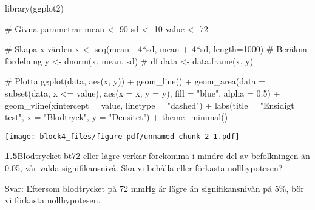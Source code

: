 \documentclass[
  letterpaper,
  DIV=11,
  numbers=noendperiod]{scrartcl}
\newenvironment{Shaded}{\begin{snugshade}}{\end{snugshade}}
\newcommand{\AttributeTok}[1]{\textcolor[rgb]{0.40,0.45,0.13}{#1}}
\newcommand{\CommentTok}[1]{\textcolor[rgb]{0.37,0.37,0.37}{#1}}
\newcommand{\DecValTok}[1]{\textcolor[rgb]{0.68,0.00,0.00}{#1}}
\newcommand{\FloatTok}[1]{\textcolor[rgb]{0.68,0.00,0.00}{#1}}
\newcommand{\FunctionTok}[1]{\textcolor[rgb]{0.28,0.35,0.67}{#1}}
\newcommand{\NormalTok}[1]{\textcolor[rgb]{0.00,0.23,0.31}{#1}}
\newcommand{\OtherTok}[1]{\textcolor[rgb]{0.00,0.23,0.31}{#1}}
\newcommand{\SpecialCharTok}[1]{\textcolor[rgb]{0.37,0.37,0.37}{#1}}
\newcommand{\StringTok}[1]{\textcolor[rgb]{0.13,0.47,0.30}{#1}}
\begin{document}
\begin{Shaded}
\begin{Highlighting}[]
\FunctionTok{library}\NormalTok{(ggplot2)}

\CommentTok{\# Givna parametrar}
\NormalTok{mean }\OtherTok{\textless{}{-}} \DecValTok{90}
\NormalTok{sd }\OtherTok{\textless{}{-}} \DecValTok{10}
\NormalTok{value }\OtherTok{\textless{}{-}} \DecValTok{72}

\CommentTok{\# Skapa x värden}
\NormalTok{x }\OtherTok{\textless{}{-}} \FunctionTok{seq}\NormalTok{(mean }\SpecialCharTok{{-}} \DecValTok{4}\SpecialCharTok{*}\NormalTok{sd, mean }\SpecialCharTok{+} \DecValTok{4}\SpecialCharTok{*}\NormalTok{sd, }\AttributeTok{length=}\DecValTok{1000}\NormalTok{)}
\CommentTok{\# Beräkna fördelning}
\NormalTok{y }\OtherTok{\textless{}{-}} \FunctionTok{dnorm}\NormalTok{(x, mean, sd)}
\CommentTok{\# df}
\NormalTok{data }\OtherTok{\textless{}{-}} \FunctionTok{data.frame}\NormalTok{(x, y)}

\CommentTok{\# Plotta}
\FunctionTok{ggplot}\NormalTok{(data, }\FunctionTok{aes}\NormalTok{(x, y)) }\SpecialCharTok{+}
  \FunctionTok{geom\_line}\NormalTok{() }\SpecialCharTok{+}
  \FunctionTok{geom\_area}\NormalTok{(}\AttributeTok{data =} \FunctionTok{subset}\NormalTok{(data, x }\SpecialCharTok{\textless{}=}\NormalTok{ value), }\FunctionTok{aes}\NormalTok{(}\AttributeTok{x =}\NormalTok{ x, }\AttributeTok{y =}\NormalTok{ y), }\AttributeTok{fill =} \StringTok{"blue"}\NormalTok{, }\AttributeTok{alpha =} \FloatTok{0.5}\NormalTok{) }\SpecialCharTok{+}
  \FunctionTok{geom\_vline}\NormalTok{(}\AttributeTok{xintercept =}\NormalTok{ value, }\AttributeTok{linetype =} \StringTok{"dashed"}\NormalTok{) }\SpecialCharTok{+}
  \FunctionTok{labs}\NormalTok{(}\AttributeTok{title =} \StringTok{"Ensidigt test"}\NormalTok{, }\AttributeTok{x =} \StringTok{"Blodtryck"}\NormalTok{, }\AttributeTok{y =} \StringTok{"Densitet"}\NormalTok{) }\SpecialCharTok{+}
  \FunctionTok{theme\_minimal}\NormalTok{()}
\end{Highlighting}
\end{Shaded}

\texttt{[image: block4\_files/figure-pdf/unnamed-chunk-2-1.pdf]}

\textbf{1.5}Blodtrycket bt72 eller lägre verkar förekomma i mindre del
av befolkningen än 0.05, vår valda signifikansnivå. Ska vi behålla eller
förkasta nollhypotesen?

\hfill\break
Svar: Eftersom blodtrycket på 72 mmHg är lägre än signifikansnivån på
5\%, bör vi förkasta nollhypotesen.\\
\end{document}
